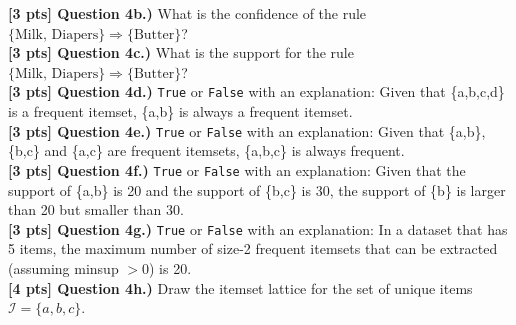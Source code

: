 \documentclass[paper=a4, fontsize=11pt]{scrartcl} %
\begin{document}
\textbf{[3 pts] Question 4b.)} What is the confidence of the rule $\{ \text{Milk, Diapers} \} \Rightarrow \{ \text{Butter} \}$? \\

\textbf{[3 pts] Question 4c.)} What is the support for the rule $\{ \text{Milk, Diapers} \} \Rightarrow \{ \text{Butter} \}$? \\

\textbf{[3 pts] Question 4d.)} \verb"True" or \verb"False" with an explanation: Given that \{a,b,c,d\} is a frequent itemset, \{a,b\} is always a frequent itemset. \\

\textbf{[3 pts] Question 4e.)} \verb"True" or \verb"False" with an explanation: Given that \{a,b\}, \{b,c\} and \{a,c\} are frequent itemsets, \{a,b,c\} is always frequent. \\

\textbf{[3 pts] Question 4f.)} \verb"True" or \verb"False" with an explanation: Given that the support of \{a,b\} is 20 and the support of \{b,c\} is 30, the support of \{b\} is larger than 20 but smaller than 30. \\

\textbf{[3 pts] Question 4g.)} \verb"True" or \verb"False" with an explanation: In a dataset that has 5 items, the maximum number of size-2 frequent itemsets that can be extracted (assuming minsup $> 0$) is 20. \\

\textbf{[4 pts] Question 4h.)} Draw the itemset lattice for the set of unique items $\mathcal{I} = \{ a, b, c \}$. \\
\end{document}
